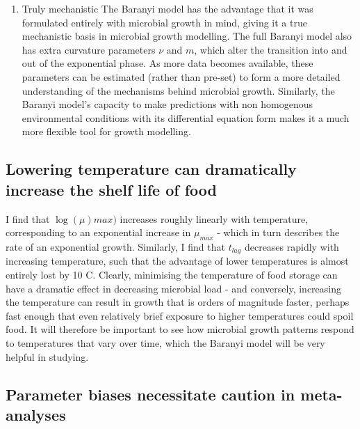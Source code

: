 \documentclass[11pt, a4paper]{article}
\begin{document}
\begin{linenumbers}
\begin{enumerate}
\item{Truly mechanistic}
The Baranyi model has the advantage that it was formulated entirely with microbial growth in mind, giving it a true mechanistic basis in microbial growth modelling. The full Baranyi model also has extra curvature parameters $\nu$ and $m$, which alter the transition into and out of the exponential phase. As more data becomes available, these parameters can be estimated (rather than pre-set) to form a more detailed understanding of the mechanisms behind microbial growth. Similarly, the Baranyi model's capacity to make predictions with non homogenous environmental conditions with its differential equation form makes it a much more flexible tool for growth modelling. 

 \end{enumerate}

\subsection{Lowering temperature can dramatically increase the shelf life of food}

I find that $\log(\mu){max})$ increases roughly linearly with temperature, corresponding to an exponential increase in $\mu_{max}$  - which in turn describes the rate of an exponential growth. Similarly, I find that $t_{lag}$ decreases rapidly with increasing temperature, such that the advantage of lower temperatures is almost entirely lost by 10 \degree C. Clearly, minimising the temperature of food storage can have a dramatic effect in decreasing microbial load - and conversely, increasing the temperature can result in growth that is orders of magnitude faster, perhaps fast enough that even relatively brief exposure to higher temperatures could spoil food. It will therefore be important to see how microbial growth patterns respond to temperatures that vary over time, which the Baranyi model will be very helpful in studying.

\subsection{Parameter biases necessitate caution in meta-analyses}


\end{linenumbers}
\end{document}
